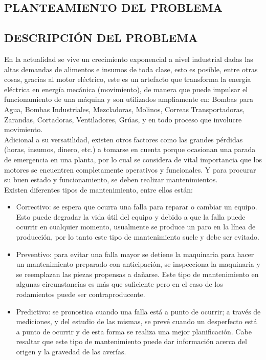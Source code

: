 
\begin{center}
	\section{PLANTEAMIENTO DEL PROBLEMA}
\end{center}


\subsection{DESCRIPCIÓN DEL PROBLEMA}

	En la actualidad se vive un crecimiento exponencial a nivel industrial dadas las altas demandas de alimentos e insumos de toda clase, esto es posible, entre otras cosas, gracias al motor eléctrico, este es un artefacto que transforma la energía eléctrica en energía mecánica (movimiento), de manera que puede impulsar el funcionamiento de una máquina y son utilizados ampliamente en: Bombas para Agua, Bombas Industriales, Mezcladoras, Molinos, Correas Transportadoras, Zarandas, Cortadoras, Ventiladores, Grúas, y en todo proceso que involucre movimiento.\\


	Adicional a su versatilidad, existen otros factores como las grandes pérdidas (horas, insumos, dinero, etc.) a tomarse en cuenta porque ocasionan una parada de emergencia en una planta, por lo cual se considera de vital importancia que los motores se encuentren completamente operativos y funcionales. Y para procurar su buen estado y funcionamiento, se deben realizar mantenimientos.\\



	Existen diferentes tipos de mantenimiento, entre ellos están:
	\begin{itemize}
		\item Correctivo: se espera que ocurra una falla para reparar o cambiar un equipo. Esto puede degradar la vida útil del equipo y debido a que la falla puede ocurrir en cualquier momento, usualmente se produce un paro en la línea de producción, por lo tanto este tipo de mantenimiento suele y debe ser evitado.

		\item Preventivo: para evitar una falla mayor se detiene la maquinaria para hacer un mantenimiento preparado con anticipación, se inspecciona la maquinaria y se reemplazan las piezas propensas a dañarse. Este tipo de mantenimiento en algunas circunstancias es más que suficiente pero en el caso de los rodamientos puede ser contraproducente.

		\item Predictivo: se pronostica cuando una falla está a punto de ocurrir; a través de mediciones, y del estudio de las mismas, se prevé cuando un desperfecto está a punto de ocurrir y de esta forma se realiza una mejor planificación. Cabe resaltar que este tipo de mantenimiento puede dar información acerca del origen y la gravedad de las averías.
	\end{itemize}


